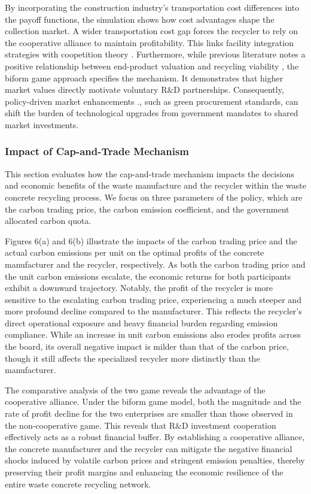 \documentclass[authoryear,preprint,review,times,10pt]{elsarticle}
\begin{document}
By incorporating the construction industry's transportation cost differences into the payoff functions, the simulation shows how cost advantages shape the collection market. A wider transportation cost gap forces the recycler to rely on the cooperative alliance to maintain profitability. This links facility integration strategies \citep{liu2019Expand} with coopetition theory \citep{lin2025Cooperation}. Furthermore, while previous literature notes a positive relationship between end-product valuation and recycling viability \citep{li2020Key}, the biform game approach specifies the mechanism. It demonstrates that higher market values directly motivate voluntary R\&D partnerships. Consequently, policy-driven market enhancements \citep{su2024Stakeholder}., such as green procurement standards, can shift the burden of technological upgrades from government mandates to shared market investments.


\subsubsection{Impact of Cap-and-Trade Mechanism}
\label{sec:cap_and_trade}

This section evaluates how the cap-and-trade mechanism impacts the decisions and economic benefits of the waste manufacture and the recycler within the waste concrete recycling process. We focus on three parameters of the policy, which are the carbon trading price, the carbon emission coefficient, and the government allocated carbon quota.

Figures 6(a) and 6(b) illustrate the impacts of the carbon trading price and the actual carbon emissions per unit on the optimal profits of the concrete manufacturer and the recycler, respectively. As both the carbon trading price and the unit carbon emissions escalate, the economic returns for both participants exhibit a downward trajectory. Notably, the profit of the recycler is more sensitive to the escalating carbon trading price, experiencing a much steeper and more profound decline compared to the manufacturer. This reflects the recycler's direct operational exposure and heavy financial burden regarding emission compliance. While an increase in unit carbon emissions also erodes profits across the board, its overall negative impact is milder than that of the carbon price, though it still affects the specialized recycler more distinctly than the manufacturer.

The comparative analysis of the two game reveals the advantage of the cooperative alliance. Under the biform game model, both the magnitude and the rate of profit decline for the two enterprises are smaller than those observed in the non-cooperative game. This reveals that R\&D investment cooperation effectively acts as a robust financial buffer. By establishing a cooperative alliance, the concrete manufacturer and the recycler can mitigate the negative financial shocks induced by volatile carbon prices and stringent emission penalties, thereby preserving their profit margins and enhancing the economic resilience of the entire waste concrete recycling network.
\end{document}
